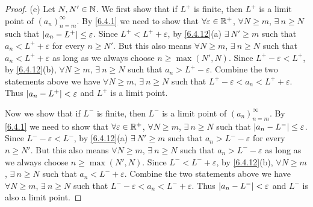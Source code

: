 \begin{proof}{(e)}
  Let \(N, N' \in \mathbb{N}\).
  We first show that if \(L^+\) is finite, then \(L^+\) is a limit point of \((a_n)_{n = m}^\infty\).
  By \cref{6.4.1} we need to show that \(\forall \varepsilon \in \mathbb{R}^+\), \(\forall N \geq m\), \(\exists\ n \geq N\) such that \(\left\lvert a_n - L^+\right\rvert \leq \varepsilon\).
  Since \(L^+ < L^+ + \varepsilon\), by \cref{6.4.12}(a) \(\exists\ N' \geq m\) such that \(a_n < L^+ + \varepsilon\) for every \(n \geq N'\).
  But this also means \(\forall N \geq m\), \(\exists\ n \geq N\) such that \(a_n < L^+ + \varepsilon\) as long as we always choose \(n \geq \max(N', N)\).
  Since \(L^+ - \varepsilon < L^+\), by \cref{6.4.12}(b), \(\forall N \geq m\), \(\exists\ n \geq N\) such that \(a_n > L^+ - \varepsilon\).
  Combine the two statements above we have \(\forall N \geq m\), \(\exists\ n \geq N\) such that \(L^+ - \varepsilon < a_n < L^+ + \varepsilon\).
  Thus \(\left\lvert a_n - L^+\right\rvert < \varepsilon\) and \(L^+\) is a limit point.

  Now we show that if \(L^-\) is finite, then \(L^-\) is a limit point of \((a_n)_{n = m}^\infty\).
  By \cref{6.4.1} we need to show that \(\forall \varepsilon \in \mathbb{R}^+\), \(\forall N \geq m\), \(\exists\ n \geq N\) such that \(\left\lvert a_n - L^-\right\rvert \leq \varepsilon\).
  Since \(L^- - \varepsilon < L^-\), by \cref{6.4.12}(a) \(\exists\ N' \geq m\) such that \(a_n > L^- - \varepsilon\) for every \(n \geq N'\).
  But this also means \(\forall N \geq m\), \(\exists\ n \geq N\) such that \(a_n > L^- - \varepsilon\) as long as we always choose \(n \geq \max(N', N)\).
  Since \(L^- < L^- + \varepsilon\), by \cref{6.4.12}(b), \(\forall N \geq m\), \(\exists\ n \geq N\) such that \(a_n < L^- + \varepsilon\).
  Combine the two statements above we have \(\forall N \geq m\), \(\exists\ n \geq N\) such that \(L^- - \varepsilon < a_n < L^- + \varepsilon\).
  Thus \(\left\lvert a_n - L^-\right\rvert < \varepsilon\) and \(L^-\) is also a limit point.
\end{proof}

